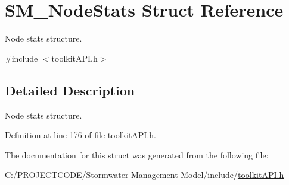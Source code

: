 \hypertarget{struct_s_m___node_stats}{}\section{S\+M\+\_\+\+Node\+Stats Struct Reference}
\label{struct_s_m___node_stats}


Node stats structure.  




{\ttfamily \#include $<$toolkit\+A\+P\+I.\+h$>$}



\subsection{Detailed Description}
Node stats structure. 

Definition at line 176 of file toolkit\+A\+P\+I.\+h.



The documentation for this struct was generated from the following file\+:\begin{DoxyCompactItemize}
\item 
C\+:/\+P\+R\+O\+J\+E\+C\+T\+C\+O\+D\+E/\+Stormwater-\/\+Management-\/\+Model/include/\hyperlink{toolkit_a_p_i_8h}{toolkit\+A\+P\+I.\+h}\end{DoxyCompactItemize}

